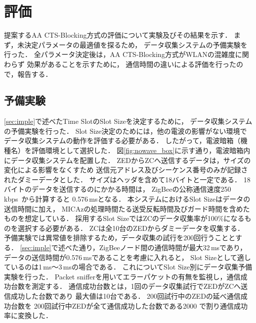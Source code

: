 \documentclass[technicalreport]{ieicej}
\begin{document}

\section{評価}
\label{sec:eval}

提案するAA CTS-Blocking方式の評価について実験及びその結果を示す．
まず，未決定パラメータの最適値を探るため，
データ収集システムの予備実験を行った．
全パラメータ決定後は，AA CTS-Blocking方式がWLANの混雑度に関わらず
効果があることを示すために，
通信時間の違いによる評価を行ったので，報告する．


\subsection{予備実験}
\label{ssec:before_exp}

\ref{sec:imple}で述べたTime SlotのSlot Sizeを決定するために，
データ収集システムの予備実験を行った．
Slot Size決定のためには，他の電波の影響がない環境で
データ収集システムの動作を評価する必要がある．
したがって，電波暗箱（機種名）を評価環境として選択した．
図\ref{fig:nowave_box}に示す通り，電波暗箱内にデータ収集システムを配置した．
ZEDからZCへ送信するデータは，サイズの変化による影響をなくすため
送信元アドレス及びシーケンス番号のみが記録されたダミーデータとした．
サイズはヘッダを含めて18バイトと一定である．
18バイトのデータを送信するのにかかる時間は，
ZigBeeの公称通信速度250\,kbps~\cite{ZigBee04:}から計算すると
0.576\,msとなる．
本システムにおけるSlot Sizeはデータの送信時間に加え，
MICAzの処理時間たる送受反転時間及びガード時間を含めたものを想定している．
採用するSlot SizeではZCのデータ収集率が100\%になるものを選択する必要がある．
ZCは全10台のZEDからダミーデータを収集する．
予備実験では異常値を排除するため，データ収集の試行を200回行うこととする．
\ref{sec:imple}で述べた通り，ZigBeeノード間の通信時間が最大32\,msであり，
データの送信時間が0.576\,msであることを考慮に入れると，
Slot Sizeとして適しているのは1\,ms〜3\,msの場合である．
これについてSlot Size別にデータ収集予備実験を行った．
Packet snifferを用いてエラーパケットの有無を監視し，通信成功台数を測定する．
通信成功台数とは，1回のデータ収集試行でZEDがZCへ送信成功した台数であり
最大値は10台である．
200回試行中のZEDの延べ通信成功台数を
200回試行中ZEDが全て通信成功した台数である2000
で割り通信成功率に変換した．
\end{document}
